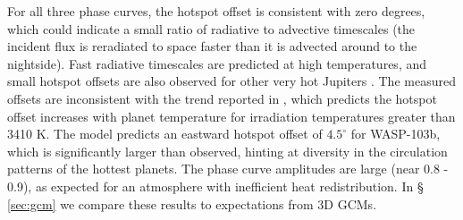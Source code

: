 \documentclass[twocolumn]{aastex61}
\newcommand{\project}[1]{\textsl{#1}}
\newcommand{\Spitzer}{\project{Spitzer}}
\begin{document}
For all three phase curves, the hotspot offset is consistent with zero degrees, which could indicate a small ratio of radiative to advective timescales (the incident flux is reradiated to space faster than it is advected around to the nightside). Fast radiative timescales are predicted at high temperatures, and small hotspot offsets are also observed for other very hot Jupiters \citep{perez13, komacek16, komacek17}.  The measured offsets are inconsistent with the trend reported in \cite{zhang17}, which predicts the hotspot offset increases with planet temperature for irradiation temperatures greater than 3410 K. The \cite{zhang17} model predicts an eastward hotspot offset of $4.5^\circ$ for WASP-103b, which is significantly larger than observed, hinting at diversity in the circulation patterns of the hottest planets.  The phase curve amplitudes are large (near 0.8 - 0.9), as expected for an atmosphere with inefficient heat redistribution. In \S\,\ref{sec:gcm} we compare these results to expectations from 3D GCMs.

\end{document}
